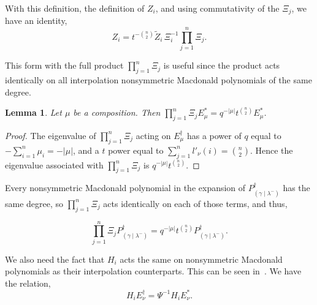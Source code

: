 \documentclass[11pt]{article}
\newtheorem{lemm}[theo]{Lemma}
\theoremstyle{definition}
\numberwithin{equation}{section}
\newcommand{\ZZ}{\widetilde{Z}}
\newcommand{\EB}[1]{E_{#1}^\dagger}
\newcommand{\Estar}[1]{E^*_{#1}}
\newcommand{\PB}[1]{P_{#1}^\dagger}
\newcommand{\gammalambdamin}{{(\gamma \mid \lambda^-)}}
\begin{document}
With this definition, the definition of $Z_i$, and using commutativity of the $\Xi_j$, we have an identity,
\[ Z_i = t^{-\binom{n}{2}} \ZZ_i\, \Xi_i^{-1} \prod_{j=1}^n \Xi_j. \]

This form with the full product $\displaystyle{\prod_{j=1}^n \Xi_j}$ is useful since the product acts identically on all interpolation nonsymmetric Macdonald polynomials of the same degree.

\begin{lemm}
Let $\mu$ be a composition. Then $\displaystyle{\prod_{j=1}^n \Xi_j \Estar{\mu} = q^{-|\mu|} t^{\binom{n}{2}} \Estar{\mu}}$.
\end{lemm} \begin{proof} The eigenvalue of $\displaystyle{\prod_{j=1}^n \Xi_j}$ acting on $E^\dagger_{\mu}$ has a power of $q$ equal to $\displaystyle{-\sum_{i=1}^n \mu_i} = -|\mu|$, and a $t$ power equal to $\displaystyle{\sum_{j=1}^n l'_\nu(i) = \binom{n}{2}}$. Hence the eigenvalue associated with $\displaystyle{\prod_{j=1}^n \Xi_j}$ is $q^{-|\mu|} t^{\binom{n}{2}}$.
\qedhere
\end{proof}


Every nonsymmetric Macdonald polynomial in the expansion of $\PB{\gammalambdamin}$ has the same degree, so $\displaystyle{\prod_{j=1}^n \Xi_j}$ acts identically on each of those terms, and thus,


\[ \prod_{j=1}^n \Xi_j \PB{\gammalambdamin} = q^{-|\mu|}t^{\binom{n}{2}} \PB{\gammalambdamin}.\]

We also need the fact that $H_i$ acts the same on nonsymmetric Macdonald polynomials as their interpolation counterparts. This can be seen in~\cite[page 6]{MR2534801}. We have the relation,
\begin{equation}\label{Tiactthesame} H_i \EB{\nu} = \Psi^{-1} H_i \Estar{\nu} .\end{equation}
\end{document}
